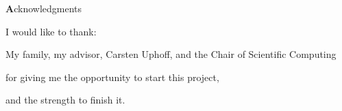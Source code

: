 \clearemptydoublepage
{}
{}

\vspace*{2cm}

\begin{center}
{\Large \textbf Acknowledgments}
\end{center}

\vspace{1cm}

\begin{center}

I would like to thank:

My family, my advisor, Carsten Uphoff, and the Chair of Scientific Computing

for giving me the opportunity to start this project, 

and the strength to finish it.

\end{center}
